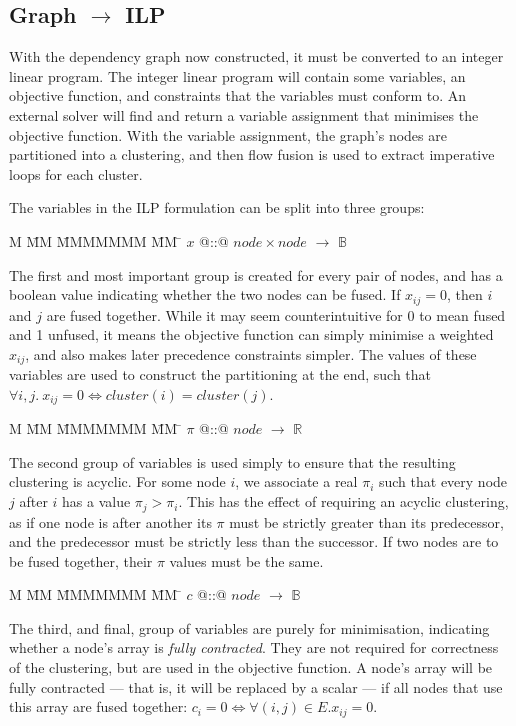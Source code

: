 \subsection{Graph $\to$ ILP}
With the dependency graph now constructed, it must be converted to an integer linear program.
The integer linear program will contain some variables, an objective function, and constraints that the variables must conform to.
An external solver will find and return a variable assignment that minimises the objective function.
With the variable assignment, the graph's nodes are partitioned into a clustering, and then flow fusion\cite{lippmeier2013flow} is used to extract imperative loops for each cluster.

The variables in the ILP formulation can be split into three groups:

\begin{tabbing}
M   \= MM \= MMMMMMM \= MM \= \kill
$x$   \> @::@  \> $node \times node$ \> $\to$ \> $\mathbb{B}$
\end{tabbing}
The first and most important group is created for every pair of nodes, and has a boolean value indicating whether the two nodes can be fused.
If $x_{ij} = 0$, then $i$ and $j$ are fused together.
While it may seem counterintuitive for 0 to mean fused and 1 unfused, it means the objective function can simply minimise a weighted $x_{ij}$, and also makes later precedence constraints simpler.
The values of these variables are used to construct the partitioning at the end, such that $\forall i,j.\ x_{ij} = 0 \iff cluster(i) = cluster(j)$.

\begin{tabbing}
M   \= MM \= MMMMMMM \= MM \= \kill
$\pi$ \> @::@  \> $node$             \> $\to$ \> $\mathbb{R}$
\end{tabbing}
The second group of variables is used simply to ensure that the resulting clustering is acyclic.
For some node $i$, we associate a real $\pi_i$ such that every node $j$ after $i$ has a value $\pi_j > \pi_i$.
This has the effect of requiring an acyclic clustering, as if one node is after another its $\pi$ must be strictly greater than its predecessor, and the predecessor must be strictly less than the successor.
If two nodes are to be fused together, their $\pi$ values must be the same.

\begin{tabbing}
M   \= MM \= MMMMMMM \= MM \= \kill
$c$   \> @::@  \> $node$             \> $\to$ \> $\mathbb{B}$
\end{tabbing}
The third, and final, group of variables are purely for minimisation, indicating whether a node's array is \emph{fully contracted}.
They are not required for correctness of the clustering, but are used in the objective function.
A node's array will be fully contracted --- that is, it will be replaced by a scalar --- if all nodes that use this array are fused together:
$c_i = 0 \iff \forall (i,j) \in E. x_{ij} = 0$.



